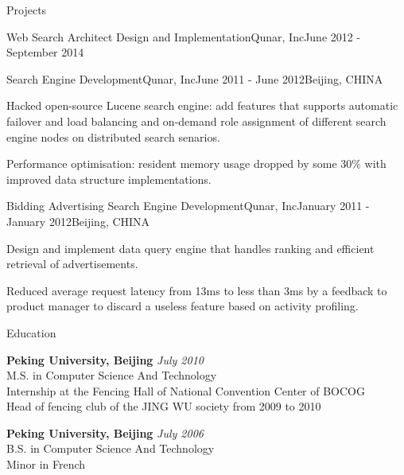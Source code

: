 \documentclass{resume} %
\begin{document}
\begin{rSection}{Projects}
\begin{rSubsection}{Web Search Architect Design and Implementation}{Qunar, Inc}{June 2012 - September 2014}
\end{rSubsection}

\begin{rSubsection}{Search Engine Development}{Qunar, Inc}{June 2011 - June 2012}{Beijing, CHINA}
\item Hacked open-source Lucene search engine: add features that supports automatic failover and load balancing and on-demand role assignment of different search engine nodes on distributed search senarios.
\item Performance optimisation: resident memory usage dropped by some 30\% with improved data structure implementations.
\end{rSubsection}

\begin{rSubsection}{Bidding Advertising Search Engine
    Development}{Qunar, Inc}{January 2011 -
    January 2012}{Beijing, CHINA}
\item Design and implement data query engine that handles ranking and efficient retrieval of advertisements.
\item Reduced average request latency from 13ms to less than 3ms by a feedback to product manager to discard a useless 
feature based on activity profiling. 
\end{rSubsection}

\end{rSection}


\begin{rSection}{Education}

{\bf Peking University, Beijing} \hfill {\em July 2010} \\ 
M.S. in Computer Science And Technology \\
Internship at the Fencing Hall of National Convention Center of BOCOG \\
Head of fencing club of the JING WU society from 2009 to 2010 

{\bf Peking University, Beijing} \hfill {\em July 2006} \\ 
B.S. in Computer Science And Technology \\
Minor in French

\end{rSection}






\end{document}
